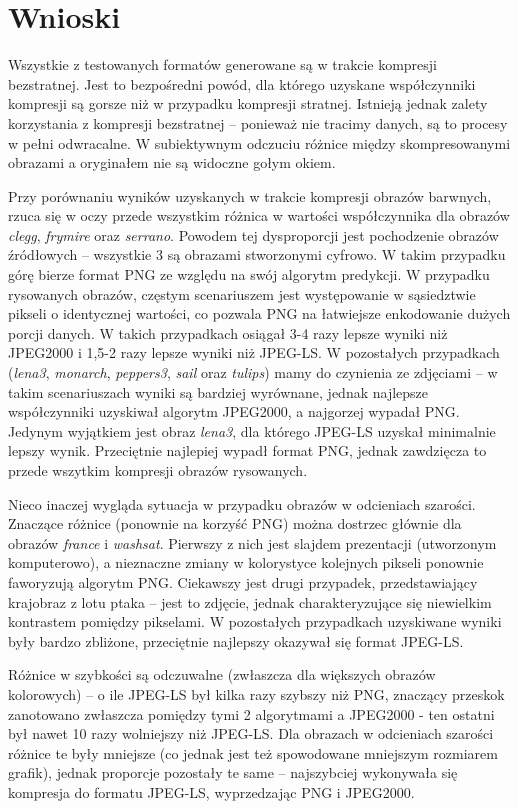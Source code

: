 \section{Wnioski}

Wszystkie z testowanych formatów generowane są w trakcie kompresji bezstratnej. Jest to bezpośredni powód, dla którego uzyskane współczynniki kompresji są gorsze niż w przypadku kompresji stratnej. Istnieją jednak zalety korzystania z kompresji bezstratnej -- ponieważ nie tracimy danych, są to procesy w pełni odwracalne. W subiektywnym odczuciu różnice między skompresowanymi obrazami a oryginałem nie są widoczne gołym okiem.

Przy porównaniu wyników uzyskanych w trakcie kompresji obrazów barwnych, rzuca się w oczy przede wszystkim różnica w wartości współczynnika dla obrazów \textit{clegg}, \textit{frymire} oraz \textit{serrano}. Powodem tej dysproporcji jest pochodzenie obrazów źródłowych -- wszystkie 3 są obrazami stworzonymi cyfrowo. W takim przypadku górę bierze format PNG ze względu na swój algorytm predykcji. W przypadku rysowanych obrazów, częstym scenariuszem jest występowanie w sąsiedztwie pikseli o identycznej wartości, co pozwala PNG na łatwiejsze enkodowanie dużych porcji danych. W takich przypadkach osiągał 3-4 razy lepsze wyniki niż JPEG2000 i 1,5-2 razy lepsze wyniki niż JPEG-LS. W pozostałych przypadkach (\textit{lena3}, \textit{monarch}, \textit{peppers3}, \textit{sail} oraz \textit{tulips}) mamy do czynienia ze zdjęciami -- w takim scenariuszach wyniki są bardziej wyrównane, jednak najlepsze współczynniki uzyskiwał algorytm JPEG2000, a najgorzej wypadał PNG. Jedynym wyjątkiem jest obraz \textit{lena3}, dla którego JPEG-LS uzyskał minimalnie lepszy wynik. Przeciętnie najlepiej wypadł format PNG, jednak zawdzięcza to przede wszytkim kompresji obrazów rysowanych.

Nieco inaczej wygląda sytuacja w przypadku obrazów w odcieniach szarości. Znaczące różnice (ponownie na korzyść PNG) można dostrzec głównie dla obrazów \textit{france} i \textit{washsat}. Pierwszy z nich jest slajdem prezentacji (utworzonym komputerowo), a nieznaczne zmiany w kolorystyce kolejnych pikseli ponownie faworyzują algorytm PNG. Ciekawszy jest drugi przypadek, przedstawiający krajobraz z lotu ptaka -- jest to zdjęcie, jednak charakteryzujące się niewielkim kontrastem pomiędzy pikselami. W pozostałych przypadkach uzyskiwane wyniki były bardzo zbliżone, przeciętnie najlepszy okazywał się format JPEG-LS.

Różnice w szybkości są odczuwalne (zwłaszcza dla większych obrazów kolorowych) -- o ile JPEG-LS był kilka razy szybszy niż PNG, znaczący przeskok zanotowano zwłaszcza pomiędzy tymi 2 algorytmami a JPEG2000 - ten ostatni był nawet 10 razy wolniejszy niż JPEG-LS. Dla obrazach w odcieniach szarości różnice te były mniejsze (co jednak jest też spowodowane mniejszym rozmiarem grafik), jednak proporcje pozostały te same -- najszybciej wykonywała się kompresja do formatu JPEG-LS, wyprzedzając PNG i JPEG2000.